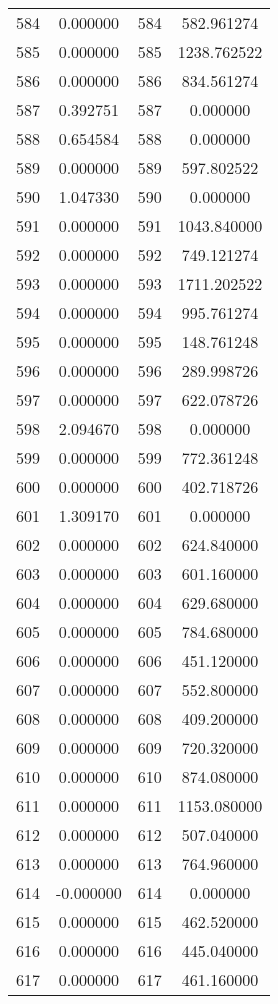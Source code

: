 \documentclass[12pt]{article}
\begin{document}
\begin{longtable}{@{}cccc@{}}
584 & 0.000000 & 584 & 582.961274 \\
585 & 0.000000 & 585 & 1238.762522 \\
586 & 0.000000 & 586 & 834.561274 \\
587 & 0.392751 & 587 & 0.000000 \\
588 & 0.654584 & 588 & 0.000000 \\
589 & 0.000000 & 589 & 597.802522 \\
590 & 1.047330 & 590 & 0.000000 \\
591 & 0.000000 & 591 & 1043.840000 \\
592 & 0.000000 & 592 & 749.121274 \\
593 & 0.000000 & 593 & 1711.202522 \\
594 & 0.000000 & 594 & 995.761274 \\
595 & 0.000000 & 595 & 148.761248 \\
596 & 0.000000 & 596 & 289.998726 \\
597 & 0.000000 & 597 & 622.078726 \\
598 & 2.094670 & 598 & 0.000000 \\
599 & 0.000000 & 599 & 772.361248 \\
600 & 0.000000 & 600 & 402.718726 \\
601 & 1.309170 & 601 & 0.000000 \\
602 & 0.000000 & 602 & 624.840000 \\
603 & 0.000000 & 603 & 601.160000 \\
604 & 0.000000 & 604 & 629.680000 \\
605 & 0.000000 & 605 & 784.680000 \\
606 & 0.000000 & 606 & 451.120000 \\
607 & 0.000000 & 607 & 552.800000 \\
608 & 0.000000 & 608 & 409.200000 \\
609 & 0.000000 & 609 & 720.320000 \\
610 & 0.000000 & 610 & 874.080000 \\
611 & 0.000000 & 611 & 1153.080000 \\
612 & 0.000000 & 612 & 507.040000 \\
613 & 0.000000 & 613 & 764.960000 \\
614 & -0.000000 & 614 & 0.000000 \\
615 & 0.000000 & 615 & 462.520000 \\
616 & 0.000000 & 616 & 445.040000 \\
617 & 0.000000 & 617 & 461.160000 \\

\end{longtable}
\end{document}
